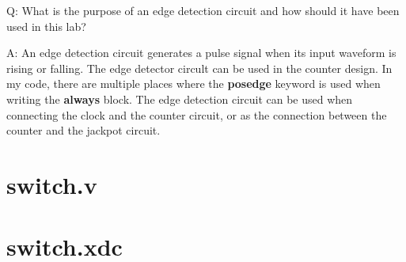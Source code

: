 \documentclass[11pt,letterpaper,titlepage]{article}
\begin{document}


Q: What is the purpose of an edge detection circuit and how should it have been used in this lab?

A: An edge detection circuit generates a pulse signal when its input waveform is rising or falling. The edge detector circult can be used in the counter design. In my code, there are multiple places where the \textbf{posedge} keyword is used when writing the \textbf{always} block. The edge detection circuit can be used when connecting the clock and the counter circuit, or as the connection between the counter and the jackpot circuit.

\newpage

\begin{appendices}

\section{switch.v}
\label{appendix:verilog_switch}


\section{switch.xdc}
\label{appendix:xdc_switch}


\end{appendices} 

\end{document}
